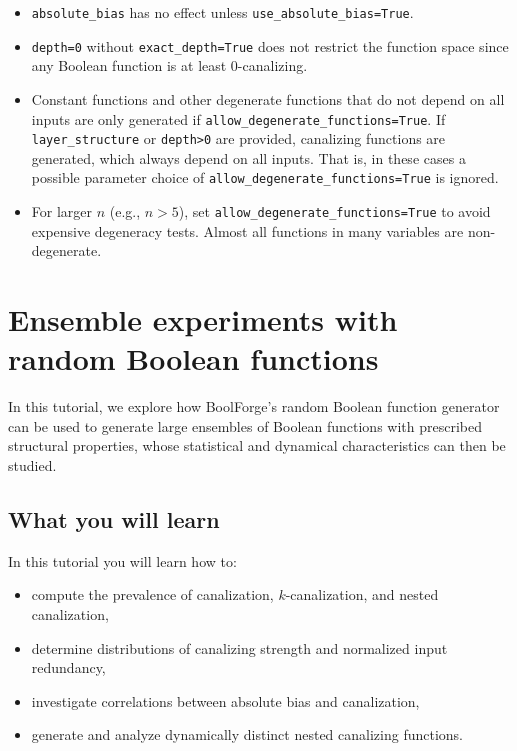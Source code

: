 \documentclass[
]{article}
\providecommand{\tightlist}{%
  \setlength{\itemsep}{0pt}\setlength{\parskip}{0pt}}
\begin{document}
\begin{itemize}
\tightlist
\item
  \texttt{absolute\_bias} has no effect unless
  \texttt{use\_absolute\_bias=True}.
\item
  \texttt{depth=0} without \texttt{exact\_depth=True} does not restrict
  the function space since any Boolean function is at least
  0-canalizing.
\item
  Constant functions and other degenerate functions that do not depend
  on all inputs are only generated if
  \texttt{allow\_degenerate\_functions=True}. If
  \texttt{layer\_structure} or \texttt{depth\textgreater{}0} are
  provided, canalizing functions are generated, which always depend on
  all inputs. That is, in these cases a possible parameter choice of
  \texttt{allow\_degenerate\_functions=True} is ignored.
\item
  For larger \(n\) (e.g., \(n>5\)), set
  \texttt{allow\_degenerate\_functions=True} to avoid expensive
  degeneracy tests. Almost all functions in many variables are
  non-degenerate.
\end{itemize}

\section{Ensemble experiments with random Boolean
functions}\label{ensemble-experiments-with-random-boolean-functions}

In this tutorial, we explore how BoolForge's random Boolean function
generator can be used to generate large ensembles of Boolean functions
with prescribed structural properties, whose statistical and dynamical
characteristics can then be studied.

\subsection{What you will learn}\label{what-you-will-learn-4}

In this tutorial you will learn how to:

\begin{itemize}
\tightlist
\item
  compute the prevalence of canalization, \(k\)-canalization, and nested
  canalization,
\item
  determine distributions of canalizing strength and normalized input
  redundancy,
\item
  investigate correlations between absolute bias and canalization,
\item
  generate and analyze dynamically distinct nested canalizing functions.
\end{itemize}
\end{document}
